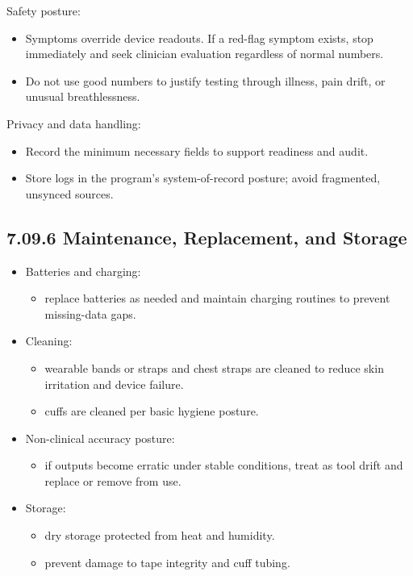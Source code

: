 \documentclass[10pt]{article}
\begin{document}
Safety posture:

\begin{itemize}
\item Symptoms override device readouts. If a red-flag symptom exists, stop immediately and seek clinician evaluation regardless of normal numbers.
\item Do not use good numbers to justify testing through illness, pain drift, or unusual breathlessness.
\end{itemize}

Privacy and data handling:

\begin{itemize}
\item Record the minimum necessary fields to support readiness and audit.
\item Store logs in the program’s system-of-record posture; avoid fragmented, unsynced sources.
\end{itemize}

\subsection*{7.09.6 Maintenance, Replacement, and Storage}
{}

\begin{itemize}
\item Batteries and charging:
  \begin{itemize}
  \item replace batteries as needed and maintain charging routines to prevent missing-data gaps.
  \end{itemize}
\item Cleaning:
  \begin{itemize}
  \item wearable bands or straps and chest straps are cleaned to reduce skin irritation and device failure.
  \item cuffs are cleaned per basic hygiene posture.
  \end{itemize}
\item Non-clinical accuracy posture:
  \begin{itemize}
  \item if outputs become erratic under stable conditions, treat as tool drift and replace or remove from use.
  \end{itemize}
\item Storage:
  \begin{itemize}
  \item dry storage protected from heat and humidity.
  \item prevent damage to tape integrity and cuff tubing.
  \end{itemize}
\end{itemize}
\end{document}
